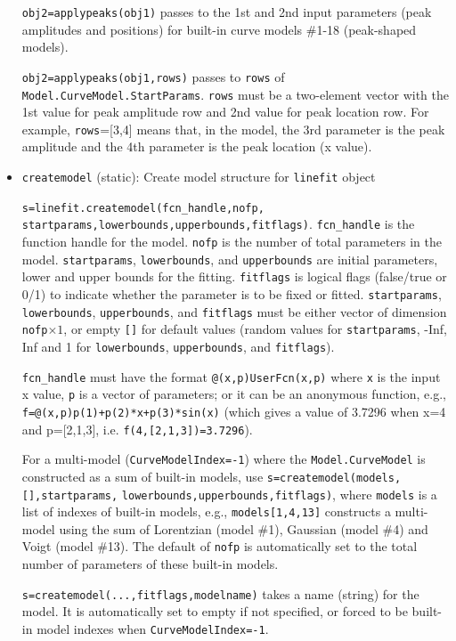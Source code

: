 \documentclass[reprint,showpacs,prb,nofootinbib,amsmath,amssymb]{revtex4-1}
\begin{document}
\begin{itemize}
\verb|obj2=applypeaks(obj1)| passes to the 1st and 2nd input parameters (peak amplitudes and positions) for built-in curve models \#1-18 (peak-shaped models).

\verb|obj2=applypeaks(obj1,rows)| passes to \verb|rows| of \verb|Model.CurveModel.StartParams|. \verb|rows| must be a two-element vector with the 1st value for peak amplitude row and 2nd  value for peak location row. For example, \verb|rows|=[3,4] means that, in the model, the 3rd parameter is the peak amplitude and the 4th  parameter is the peak location (x value).

\item \verb|createmodel| (static): Create model structure for \verb|linefit| object

\verb|s=linefit.createmodel(fcn_handle,nofp,| \verb|startparams,lowerbounds,upperbounds,fitflags)|. \verb|fcn_handle| is the function handle for the model. \verb|nofp| is the number of total parameters in the model. \verb|startparams|, \verb|lowerbounds|, and \verb|upperbounds| are initial parameters, lower and upper bounds for the fitting. \verb|fitflags| is logical flags (false/true or 0/1) to indicate whether the parameter is to be fixed or fitted. \verb|startparams|, \verb|lowerbounds|, \verb|upperbounds|, and \verb|fitflags| must be either vector of dimension \verb|nofp|$\times1$, or empty \verb|[]| for default values (random values for \verb|startparams|,
-Inf, Inf and 1 for \verb|lowerbounds|, \verb|upperbounds|, and \verb|fitflags|).

\verb|fcn_handle| must have the format \verb|@(x,p)UserFcn(x,p)| where \verb|x| is the input x value, \verb|p| is a vector of parameters; or it can be an anonymous function, e.g.,
\verb|f=@(x,p)p(1)+p(2)*x+p(3)*sin(x)| (which gives a value  of 3.7296 when
x=4 and p=[2,1,3], i.e. \verb|f(4,[2,1,3])=3.7296|).

For a multi-model (\verb|CurveModelIndex=-1|) where the \verb|Model.CurveModel| is constructed as a sum of built-in models, use \verb|s=createmodel(models,[],startparams,| \verb|lowerbounds,upperbounds,fitflags)|, where \verb|models| is a list of indexes of built-in models, e.g., \verb|models[1,4,13]| constructs a multi-model using the sum of Lorentzian (model \#1), Gaussian (model \#4) and Voigt (model \#13). The default of \verb|nofp| is automatically set to the total number of parameters of these built-in models.

\verb|s=createmodel(...,fitflags,modelname)| takes a name (string) for the model. It is automatically set to empty if not specified, or forced to be built-in model indexes when \verb|CurveModelIndex=-1|.


\end{itemize}
\end{document}
